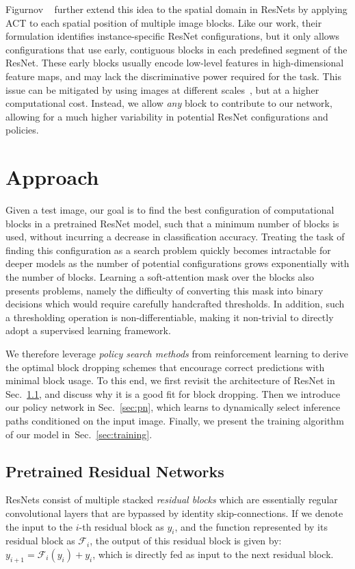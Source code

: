 \documentclass[10pt,twocolumn,letterpaper]{article}
\begin{document}
Figurnov \etal ~\cite{figurnov2017spatially} further extend this idea to the spatial domain in ResNets by applying ACT to each spatial position of multiple image blocks.  Like our work, their formulation identifies instance-specific ResNet configurations, but it only allows configurations that use early, contiguous blocks in each predefined segment of the ResNet. These early blocks usually encode low-level features in high-dimensional feature maps, and may lack the discriminative power required for the task. This issue can be mitigated by using images at different scales~\cite{mcgill2017deciding, huang2017multi}, but at a higher computational cost. Instead, we allow \emph{any} block to contribute to our network, allowing for a much higher variability in potential ResNet configurations and policies. 



\section{Approach}

Given a test image, our goal is to find the best configuration of computational blocks in a pretrained ResNet model, such that a minimum number of blocks is used, without incurring a decrease in classification accuracy. Treating the task of finding this configuration as a search problem quickly becomes intractable for deeper models as the number of potential configurations grows exponentially with the number of blocks. 
Learning a soft-attention mask over the blocks also presents problems, namely the difficulty of converting this mask into binary decisions which would require carefully handcrafted thresholds. In addition, such a thresholding operation is non-differentiable, making it non-trivial to directly adopt a supervised learning framework. 

We therefore leverage \emph{policy search methods} from reinforcement learning to derive the optimal block dropping schemes that encourage correct predictions with minimal block usage.  
To this end, we first revisit the architecture of ResNet in Sec.~\ref{sec:resnet}, and discuss why it is a good fit for block dropping. Then we introduce our  policy network in Sec.~\ref{sec:pn}, which learns to dynamically select inference paths conditioned on the input image. Finally, we present the training algorithm of our model in~Sec.~\ref{sec:training}.   
\subsection{Pretrained Residual Networks}\label{sec:resnet}
ResNets consist of multiple stacked \emph{residual blocks} which are essentially regular convolutional layers that are bypassed by identity %
skip-connections. 
If we denote the input to the $i$-th residual block as $y_i$, and the function represented by its residual block as $\mathcal{F}_i$, the output of this residual block is given by: $y_{i+1} = \mathcal{F}_i(y_i) + y_i$, which is directly fed as input to the next residual block. 
\end{document}
